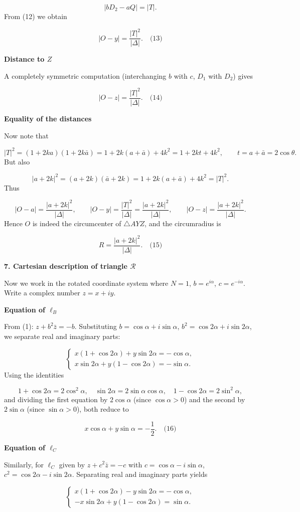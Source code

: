 \documentclass{llmxive}
\providecommand{\solutionheading}[1]{\par\smallskip\noindent\textbf{#1}\par}
\begin{document}
\[
|b D_2 - a Q| = |T|.
\]
From (12) we obtain\par
\[
|O - y| = \frac{|T|^2}{|\Delta|}. \quad\text{(13)}
\]
\solutionheading{Distance to \(Z\)}
A completely symmetric computation (interchanging \(b\) with \(c\), \(D_1\) with \(D_2\)) gives\par
\[
|O - z| = \frac{|T|^2}{|\Delta|}. \quad\text{(14)}
\]
\solutionheading{Equality of the distances}
Now note that\par
\[
|T|^2 = (1+2k a)(1+2k \bar a) = 1 + 2k(a+\bar a) + 4k^2 = 1 + 2k t + 4k^2, \qquad t = a+\bar a = 2\cos\theta.
\]
But also\par
\[
|a+2k|^2 = (a+2k)(\bar a+2k) = 1 + 2k(a+\bar a) + 4k^2 = |T|^2.
\]
Thus\par
\[
|O - a| = \frac{|a+2k|^2}{|\Delta|},\qquad
|O - y| = \frac{|T|^2}{|\Delta|} = \frac{|a+2k|^2}{|\Delta|},\qquad
|O - z| = \frac{|a+2k|^2}{|\Delta|}.
\]
Hence \(O\) is indeed the circumcenter of \(\triangle AYZ\), and the circumradius is\par
\[
R = \frac{|a+2k|^2}{|\Delta|}. \quad\text{(15)}
\]
\smallskip
\solutionheading{7. Cartesian description of triangle \(\mathcal{R}\)}
Now we work in the rotated coordinate system where \(N=1\), \(b=e^{i\alpha}\), \(c=e^{-i\alpha}\). Write a complex number \(z = x + iy\).\par
\solutionheading{Equation of \(\ell_B\)}
From (1): \(z + b^2\bar{z} = -b\). Substituting \(b = \cos\alpha + i\sin\alpha\), \(b^2 = \cos2\alpha + i\sin2\alpha\), we separate real and imaginary parts:\par
\[
\begin{cases}
x(1+\cos2\alpha) + y\sin2\alpha = -\cos\alpha, \\[2mm]
x\sin2\alpha + y(1-\cos2\alpha) = -\sin\alpha.
\end{cases}
\]
Using the identities\par
\[
1+\cos2\alpha = 2\cos^2\alpha,\quad \sin2\alpha = 2\sin\alpha\cos\alpha,\quad 1-\cos2\alpha = 2\sin^2\alpha,
\]
and dividing the first equation by \(2\cos\alpha\) (since \(\cos\alpha>0\)) and the second by \(2\sin\alpha\) (since \(\sin\alpha>0\)), both reduce to\par
\[
x\cos\alpha + y\sin\alpha = -\frac12. \quad\text{(16)}
\]
\solutionheading{Equation of \(\ell_C\)}
Similarly, for \(\ell_C\) given by \(z + c^2\bar{z} = -c\) with \(c = \cos\alpha - i\sin\alpha\), \(c^2 = \cos2\alpha - i\sin2\alpha\). Separating real and imaginary parts yields\par
\[
\begin{cases}
x(1+\cos2\alpha) - y\sin2\alpha = -\cos\alpha, \\[2mm]
- x\sin2\alpha + y(1-\cos2\alpha) = \sin\alpha.
\end{cases}
\]
\end{document}

